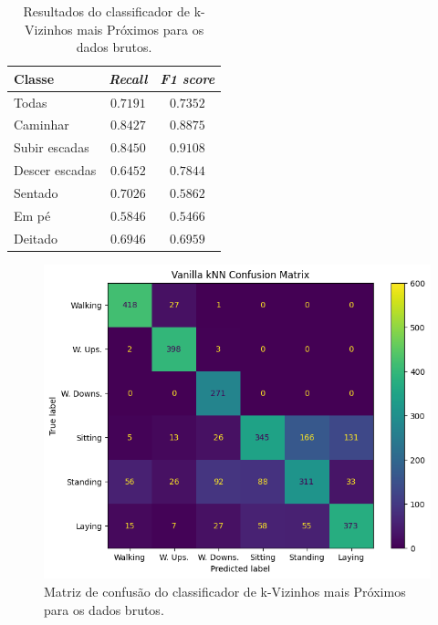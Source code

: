 \documentclass[final,5p]{elsarticle}
\numberwithin{equation}{section}
\begin{document}
        \begin{table}[h]
            \centering
            \begin{tabular}{l c c}
                \toprule
                \textbf{Classe} & \textbf{\emph{Recall}}  & \textbf{\emph{F1 score}} \\
                \midrule
                Todas & $0.7191$ & $0.7352$ \\
                \addlinespace
                Caminhar   & $0.8427$ & $0.8875$ \\
                Subir escadas   & $0.8450$ & $0.9108$ \\
                Descer escadas & $0.6452$ & $0.7844$ \\
                Sentado   & $0.7026$ & $0.5862$ \\
                Em pé  & $0.5846$ & $0.5466$ \\
                Deitado    & $0.6946$ & $0.6959$ \\
                \bottomrule
            \end{tabular}
            \caption{Resultados do classificador de k-Vizinhos mais Próximos para os dados brutos.}
            \label{tab:resultados_knn_vanilla_brutos}
        \end{table}

        \begin{figure}[hbt!]
            \includegraphics[width=0.95\columnwidth]{B_kNN_Vanilla_CM.png}
            \caption{Matriz de confusão do classificador de k-Vizinhos mais Próximos para os dados brutos.}
            \label{fig:cm_knn_vanilla_brutos}
        \end{figure}
\end{document}
